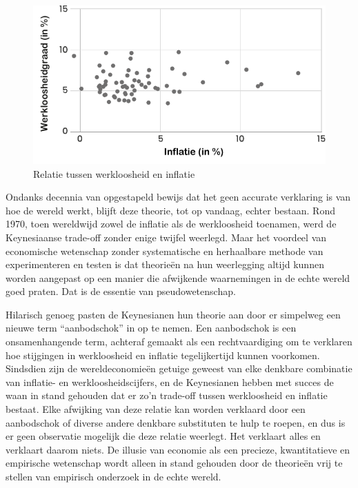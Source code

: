 \begin{figure}[!htb]
\centering
    \includegraphics[width=\textwidth]{figures/fig1.pdf}
\caption[Relatie tussen werkloosheid en inflatie]{Relatie tussen werkloosheid en inflatie\footnotemark}
\label{fig1}
\end{figure}
\autocite{11}


Ondanks decennia van opgestapeld bewijs dat het geen accurate verklaring is van hoe de wereld werkt, blijft deze theorie, tot op vandaag, echter bestaan. Rond 1970, toen wereldwijd zowel de inflatie als de werkloosheid toenamen, werd de Keynesiaanse trade-off zonder enige twijfel weerlegd. Maar het voordeel van economische wetenschap zonder systematische en herhaalbare methode van experimenteren en testen is dat theorieën na hun weerlegging altijd kunnen worden aangepast op een manier die afwijkende waarnemingen in de echte wereld goed praten. Dat is de essentie van pseudowetenschap.

Hilarisch genoeg pasten de Keynesianen hun theorie aan door er simpelweg een nieuwe term ``aanbodschok'' in op te nemen. Een aanbodschok is een onsamenhangende term, achteraf gemaakt als een rechtvaardiging om te verklaren hoe stijgingen in werkloosheid en inflatie tegelijkertijd kunnen voorkomen. Sindsdien zijn de wereldeconomieën getuige geweest van elke denkbare combinatie van inflatie- en werkloosheidscijfers, en de Keynesianen hebben met succes de waan in stand gehouden dat er zo’n trade-off tussen werkloosheid en inflatie bestaat. Elke afwijking van deze relatie kan worden verklaard door een aanbodschok of diverse andere denkbare substituten te hulp te roepen, en dus is er geen observatie mogelijk die deze relatie weerlegt. Het verklaart alles en verklaart daarom niets. De illusie van economie als een precieze, kwantitatieve en empirische wetenschap wordt alleen in stand gehouden door de theorieën vrij te stellen van empirisch onderzoek in de echte wereld.

